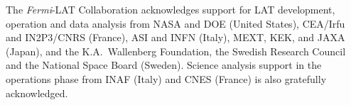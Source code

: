 \documentclass{PoS}
\begin{document}
\acknowledgments

The \textit{Fermi}-LAT Collaboration acknowledges support for LAT
development, operation and data analysis from NASA and DOE (United
States), CEA/Irfu and IN2P3/CNRS (France), ASI and INFN (Italy), MEXT,
KEK, and JAXA (Japan), and the K.A.~Wallenberg Foundation, the Swedish
Research Council and the National Space Board (Sweden). Science
analysis support in the operations phase from INAF (Italy) and CNES
(France) is also gratefully acknowledged.





\end{document}

